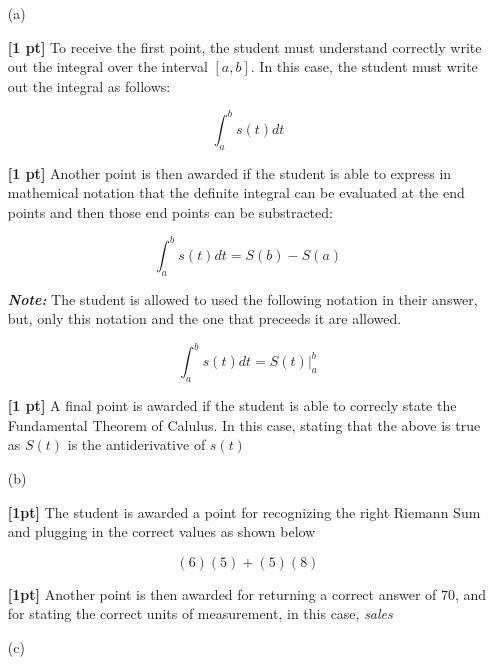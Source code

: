 \documentclass{article}
\newcommand{\qspace}{\vspace*{1.7em}}
\begin{document}
    \begin{enumerate}

		\item[(a)]
		
            \textbf{[1 pt]} To receive the first point, the student must understand correctly write out the integral over the interval
                            $[a, b]$. In this case, the student must write out the integral as follows:

                            \[
                                \int_a^b s(t)dt    
                            \]

            \textbf{[1 pt]} Another point is then awarded if the student is able to express in mathemical notation that the definite integral
                            can be evaluated at the end points and then those end points can be substracted:

                            \[
                                \int_a^b s(t)dt = S(b) - S(a)
                            \]

            \textbf{\textit{Note: }}The student is allowed to used the following notation in their answer, but, only this notation  
                                    and the one that preceeds it are allowed.

                                    \[
                                        \int_a^b s(t)dt = S(t) |_{a}^{b}
                                    \]


		
            \textbf{[1 pt]} A final point is awarded if the student is able to correcly state the Fundamental Theorem of Calulus. In this case, 
                            stating that the above is true as $S(t)$ is the antiderivative of $s(t)$ \qspace 

		\item[(b)]
		
                \textbf{[1pt]} The student is awarded a point for recognizing the right Riemann Sum and plugging in the correct values
                as shown below

                \[
                        (6)(5) + (5)(8)
                \]

                \textbf{[1pt]} Another point is then awarded for returning a correct answer of $70$, and for stating the 
                correct units of measurement, in this case, \textit{sales} \qspace
		
        \item[(c)]
        

\end{enumerate}
\end{document}

